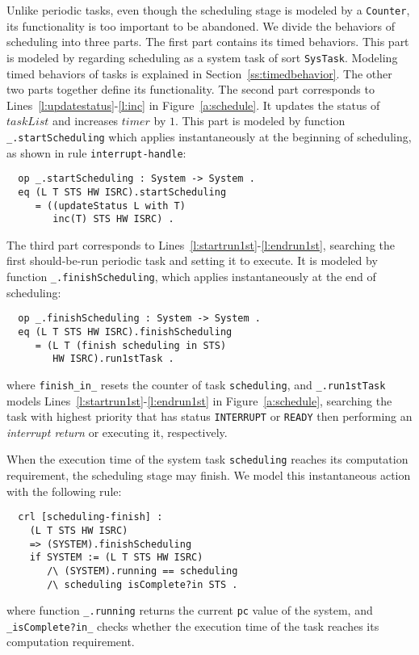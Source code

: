 \documentclass[10pt,journal]{IEEEtran}
\newcommand{\hide}[1]{\ignorespaces}
\begin{document}
Unlike periodic tasks, even though the scheduling stage is modeled by
a \verb|Counter|, its functionality is too important to be abandoned.
We divide the behaviors of scheduling into three parts.  The first
part contains its timed behaviors. This part is modeled by regarding
scheduling as a system task of sort \verb|SysTask|. Modeling timed
behaviors of tasks is explained in Section~\ref{ss:timedbehavior}.
The other two parts together define its functionality. The second part
corresponds to Lines~\ref{l:updatestatus}-\ref{l:inc} in
Figure~\ref{a:schedule}. It updates the status of $taskList$ and
increases $timer$ by $1$. This part is modeled by function
\verb|_.startScheduling| which applies instantaneously at the
beginning of scheduling, as shown in rule \verb|interrupt-handle|:
\begin{verbatim}
  op _.startScheduling : System -> System .
  eq (L T STS HW ISRC).startScheduling 
     = ((updateStatus L with T) 
        inc(T) STS HW ISRC) .
\end{verbatim}
The third part corresponds to
Lines~\ref{l:startrun1st}-\ref{l:endrun1st}, searching the first
should-be-run periodic task and setting it to execute. It is modeled
by function \verb|_.finishScheduling|, which applies instantaneously
at the end of scheduling:
\begin{verbatim}
  op _.finishScheduling : System -> System .
  eq (L T STS HW ISRC).finishScheduling
     = (L T (finish scheduling in STS) 
        HW ISRC).run1stTask .
\end{verbatim}
where \verb|finish_in_| resets the counter of task \verb|scheduling|,
and \verb|_.run1stTask| models
Lines~\ref{l:startrun1st}-\ref{l:endrun1st} in
Figure~\ref{a:schedule}, searching the task with highest priority
that has status \verb|INTERRUPT| or \verb|READY| then performing an
\emph{interrupt return} or executing it, respectively.

When the execution time of the system task \verb|scheduling| reaches
its computation requirement, the scheduling stage may finish. We model
this instantaneous action with the following rule:
\begin{verbatim}
  crl [scheduling-finish] :
    (L T STS HW ISRC) 
    => (SYSTEM).finishScheduling
    if SYSTEM := (L T STS HW ISRC) 
       /\ (SYSTEM).running == scheduling 
       /\ scheduling isComplete?in STS .
\end{verbatim}
where function \verb|_.running| returns the current \verb|pc| value of
the system, and \verb|_isComplete?in_| checks whether the execution
time of the task reaches its computation requirement.  
\hide{
\begin{verbatim}
  op _mayFinish?in_ : Oid SysTasks ~> Bool .
  eq O mayFinish?in [ < O : SysTask | cnt : C > REST ] 
       = C mayFinish? .
  op _mayFinish? : Counter -> Bool .
  eq [ R / [ MIN , MAX ] ] mayFinish?
       = if R lt MIN then false else true fi .
\end{verbatim}}
\end{document}
